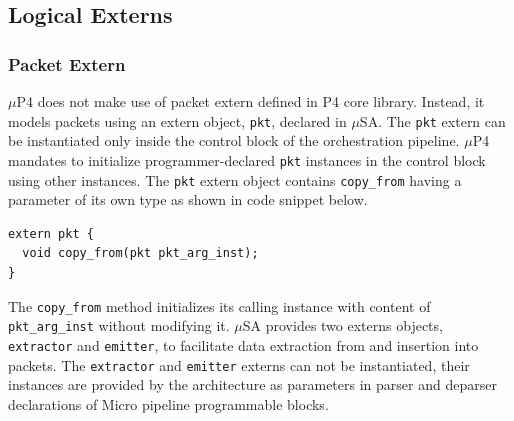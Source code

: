 \subsection{Logical Externs}
\label{subsection:logical-externs}
\subsubsection{Packet Extern}
$\mu$P4 does not make use of packet extern defined in P4 core library.
Instead, it models packets using an extern object, \texttt{pkt}, declared in $\mu$SA.
The \texttt{pkt} extern can be instantiated only inside the control block of the orchestration pipeline.
$\mu$P4 mandates to initialize programmer-declared \texttt{pkt} instances in the control block using other instances.
The \texttt{pkt} extern object contains \texttt{copy\_from} having a parameter of its own type as shown in code snippet below.
\begin{lstlisting}[frame=none]
extern pkt {
  void copy_from(pkt pkt_arg_inst);
}
\end{lstlisting}
The \texttt{copy\_from} method initializes its calling instance with content of \texttt{pkt\_arg\_inst} without modifying it.
$\mu$SA provides two externs objects, \texttt{extractor} and \texttt{emitter}, to facilitate data extraction from and insertion into packets.
The \texttt{extractor} and \texttt{emitter} externs can not be instantiated, their instances are provided by the architecture as parameters in parser and deparser declarations of Micro pipeline programmable blocks. 


